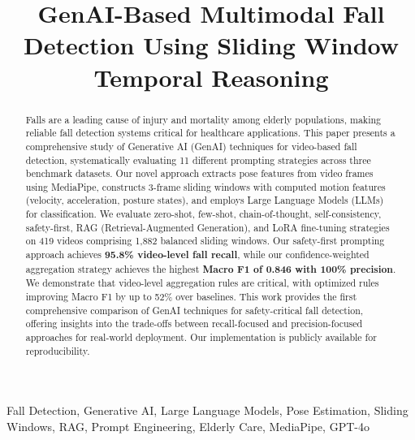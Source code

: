 \documentclass[conference]{IEEEtran}
\begin{document}
\title{GenAI-Based Multimodal Fall Detection Using Sliding Window Temporal Reasoning}

\author{
}

\maketitle

\begin{abstract}
Falls are a leading cause of injury and mortality among elderly populations, making reliable fall detection systems critical for healthcare applications. This paper presents a comprehensive study of Generative AI (GenAI) techniques for video-based fall detection, systematically evaluating 11 different prompting strategies across three benchmark datasets. Our novel approach extracts pose features from video frames using MediaPipe, constructs 3-frame sliding windows with computed motion features (velocity, acceleration, posture states), and employs Large Language Models (LLMs) for classification. We evaluate zero-shot, few-shot, chain-of-thought, self-consistency, safety-first, RAG (Retrieval-Augmented Generation), and LoRA fine-tuning strategies on 419 videos comprising 1,882 balanced sliding windows. Our safety-first prompting approach achieves \textbf{95.8\% video-level fall recall}, while our confidence-weighted aggregation strategy achieves the highest \textbf{Macro F1 of 0.846 with 100\% precision}. We demonstrate that video-level aggregation rules are critical, with optimized rules improving Macro F1 by up to 52\% over baselines. This work provides the first comprehensive comparison of GenAI techniques for safety-critical fall detection, offering insights into the trade-offs between recall-focused and precision-focused approaches for real-world deployment. Our implementation is publicly available for reproducibility.
\end{abstract}

\begin{IEEEkeywords}
Fall Detection, Generative AI, Large Language Models, Pose Estimation, Sliding Windows, RAG, Prompt Engineering, Elderly Care, MediaPipe, GPT-4o
\end{IEEEkeywords}
\end{document}
